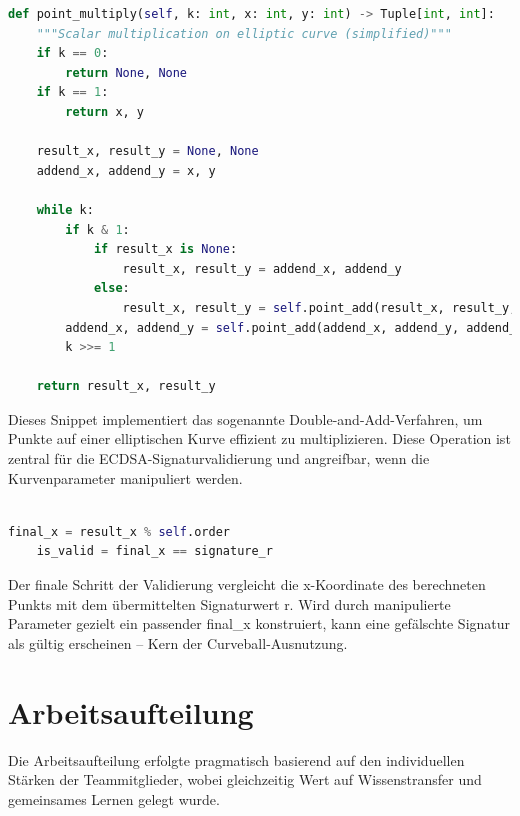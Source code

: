 \documentclass{article}
\begin{document}
\begin{lstlisting}[language=Python,caption={Punktmultiplikation auf der Kurve}]
def point_multiply(self, k: int, x: int, y: int) -> Tuple[int, int]:
    """Scalar multiplication on elliptic curve (simplified)"""
    if k == 0:
        return None, None
    if k == 1:
        return x, y

    result_x, result_y = None, None
    addend_x, addend_y = x, y

    while k:
        if k & 1:
            if result_x is None:
                result_x, result_y = addend_x, addend_y
            else:
                result_x, result_y = self.point_add(result_x, result_y, addend_x, addend_y)
        addend_x, addend_y = self.point_add(addend_x, addend_y, addend_x, addend_y)
        k >>= 1

    return result_x, result_y
\end{lstlisting}
Dieses Snippet implementiert das sogenannte Double-and-Add-Verfahren, um Punkte auf einer elliptischen Kurve effizient zu multiplizieren. Diese Operation ist zentral für die ECDSA-Signaturvalidierung und angreifbar, wenn die Kurvenparameter manipuliert werden.\\
\\
\begin{lstlisting}[language=Python,caption={Signaturprüfung mit Kurvenparametern}]
    final_x = result_x % self.order
    is_valid = final_x == signature_r
\end{lstlisting}
Der finale Schritt der Validierung vergleicht die x-Koordinate des berechneten Punkts mit dem übermittelten Signaturwert r. Wird durch manipulierte Parameter gezielt ein passender final\_x konstruiert, kann eine gefälschte Signatur als gültig erscheinen – Kern der Curveball-Ausnutzung.

\newpage
\section{Arbeitsaufteilung}

\noindent Die Arbeitsaufteilung erfolgte pragmatisch basierend auf den individuellen Stärken der Teammitglieder, wobei gleichzeitig Wert auf Wissenstransfer und gemeinsames Lernen gelegt wurde.
\end{document}
